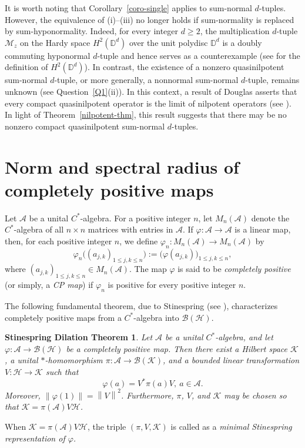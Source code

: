 \documentclass[10pt, a4paper, oneside, reqno]{amsproc}
\numberwithin{equation}{section}
\newtheorem*{SDT}{\bf Stinespring Dilation Theorem}
\theoremstyle{remark}
\theoremstyle{definition}
\newcommand*{\Ge}{\geqslant}
\newcommand*{\Le}{\leqslant}
\begin{document}
It is worth noting that Corollary~\ref{coro-single} applies to sum-normal $d$-tuples. However, the equivalence of (i)--(iii) no longer holds if sum-normality is replaced by sum-hyponormality. Indeed, for every integer $d \Ge 2$, the multiplication $d$-tuple $\mathscr M_z$ on the Hardy space $H^2(\mathbb D^d)$ over the unit polydisc $\mathbb D^d$ is a doubly commuting hyponormal $d$-tuple and hence serves as a counterexample (see \cite[Section~1.4.3]{PR2016} for the definition of $H^2(\mathbb D^d)$). In contrast, the existence of a nonzero quasinilpotent sum-normal $d$-tuple, or more generally, a nonnormal sum-normal $d$-tuple, remains unknown (see Question~\ref{Q1}(ii)). In this context, a result of Douglas asserts that every compact quasinilpotent operator is the limit of nilpotent operators (see \cite[p.~916]{H1970}). In light of Theorem~\ref{nilpotent-thm}, this result suggests that there may be no nonzero compact quasinilpotent sum-normal $d$-tuples.
  

\appendix

\section{Norm and spectral radius of completely positive maps}

Let $\mathcal{A}$ be a unital $C^*$-algebra. For a positive integer $n$, 
let $M_n(\mathcal{A})$ denote the $C^*$-algebra of all $n \times n$
matrices with entries in $\mathcal{A}$. 
If $\varphi : \mathcal{A} \rightarrow \mathcal{A}$ is a linear map,
then, for each positive integer $n$, we define $\varphi_n : M_n(\mathcal{A}) \rightarrow M_n(\mathcal{A})$ by 
\begin{equation*}
 \varphi_n\big((a_{j,k})_{1 \Le j,k \Le n}\big):=\big(\varphi(a_{j,k})\big)_{1 \Le j,k \Le n}, 
\end{equation*}
where $(a_{j,k})_{1 \Le j,k \Le n} \in M_n(\mathcal{A})$.
The map $\varphi$ is said to be \textit{completely positive} (or simply, a {\it CP map}) if $\varphi_n$ is positive
for every positive integer $n$. 

The following fundamental theorem, due to Stinespring (see \cite[Theorem 4.1]{P2003}), characterizes
completely positive maps from a $C^*$-algebra into $\mathcal{B}(\mathcal{H})$.
\begin{SDT}
Let $\mathcal{A}$ be a unital $C^*$-algebra, and let $\varphi:\mathcal{A} \to \mathcal{B}(\mathcal H)$ be a completely positive map. Then there exist a Hilbert space $\mathcal K$, a unital $*$-homomorphism $\pi :\mathcal{A} \to \mathcal{B}(\mathcal K)$, and a bounded linear transformation $V : \mathcal H \rightarrow \mathcal K$ such that \[\varphi(a) = V^*\pi(a)V, \ a \in \mathcal{A}.\]
Moreover, $\left\|\varphi(1)\right\|=\left\|V\right\|^2$.
Furthermore, $\pi$, $V$, and $\mathcal{K}$ may be chosen so that $\mathcal{K}=\pi(\mathcal{A})V\mathcal{H}$.
\end{SDT}
When $\mathcal{K}=\pi(\mathcal{A})V\mathcal{H}$, the triple $(\pi,V,\mathcal{K})$ is called as a \textit{minimal Stinespring representation of $\varphi$.}
\end{document}
